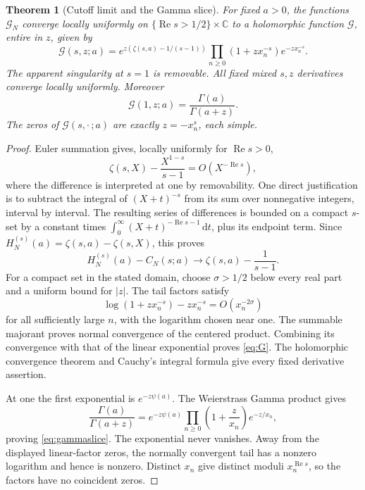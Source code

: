 \documentclass[11pt]{article}
\numberwithin{equation}{section}
\newtheorem{theorem}{Theorem}[section]
\theoremstyle{definition}\newtheorem{definition}[theorem]{Definition}
\theoremstyle{remark}\newtheorem{remark}[theorem]{Remark}
\DeclareMathOperator{\Rea}{Re}
\newcommand{\C}{\mathbb C}\newcommand{\Q}{\mathbb Q}
\newcommand{\G}{\mathcal G}\newcommand{\F}{\mathfrak F}
\newcommand{\dd}{\,\mathrm d}
\begin{document}
\begin{theorem}[Cutoff limit and the Gamma slice]
\label{thm:renorm}
For fixed $a>0$, the functions $\G_N$ converge locally uniformly on
$\{\Rea s>1/2\}\times\C$ to a holomorphic function $\G$, entire in $z$,
given by
\begin{equation}
 \G(s,z;a)=
 e^{z(\zeta(s,a)-1/(s-1))}
 \prod_{n\ge0}(1+zx_n^{-s})e^{-zx_n^{-s}}.
 \label{eq:G}
\end{equation}
The apparent singularity at $s=1$ is removable. All fixed mixed $s,z$
derivatives converge locally uniformly. Moreover
\begin{equation}
 \boxed{\G(1,z;a)=\frac{\Gamma(a)}{\Gamma(a+z)}}.
 \label{eq:gammaslice}
\end{equation}
The zeros of $\G(s,\cdot\,;a)$ are exactly $z=-x_n^s$, each simple.
\end{theorem}
\begin{proof}
Euler summation gives, locally uniformly for $\Rea s>0$,
\[
 \zeta(s,X)-\frac{X^{1-s}}{s-1}=O(X^{-\Rea s}),
\]
where the difference is interpreted at one by removability. One direct
justification is to subtract the integral of $(X+t)^{-s}$ from its sum over
nonnegative integers, interval by interval. The resulting series of
differences is bounded on a compact $s$-set by a constant times
$\int_0^\infty(X+t)^{-\Rea s-1}\dd t$, plus its endpoint term. Since
$H_N^{(s)}(a)=\zeta(s,a)-\zeta(s,X)$, this proves
\[
 H_N^{(s)}(a)-C_N(s;a)
 \longrightarrow\zeta(s,a)-\frac1{s-1}.
\]
For a compact set in the stated domain, choose $\sigma>1/2$ below every
real part and a uniform bound for $|z|$. The tail factors satisfy
\[
 \log(1+zx_n^{-s})-zx_n^{-s}=O(x_n^{-2\sigma})
\]
for all sufficiently large $n$, with the logarithm chosen near one.
The summable majorant proves normal convergence of the centered product.
Combining its convergence with that of the linear exponential proves
\eqref{eq:G}. The holomorphic convergence theorem and Cauchy's integral
formula give every fixed derivative assertion.

At one the first exponential is $e^{-z\psi(a)}$. The Weierstrass Gamma
product \cite{DLMFgamma} gives
\[
 \frac{\Gamma(a)}{\Gamma(a+z)}
 =e^{-z\psi(a)}\prod_{n\ge0}
       \left(1+\frac z{x_n}\right)e^{-z/x_n},
\]
proving \eqref{eq:gammaslice}. The exponential never vanishes. Away from
the displayed linear-factor zeros, the normally convergent tail has a
nonzero logarithm and hence is nonzero. Distinct $x_n$ give distinct moduli
$x_n^{\Rea s}$, so the factors have no coincident zeros.
\end{proof}
\end{document}
